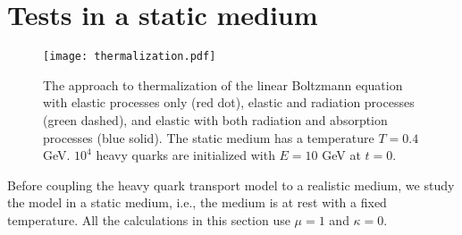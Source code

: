 \section{Tests in a static medium}\label{section:test}
\begin{figure}
\texttt{[image: thermalization.pdf]}
\caption{The approach to thermalization of the linear Boltzmann equation with elastic processes only (red dot), elastic and radiation processes (green dashed), and elastic with both radiation and absorption processes (blue solid). The static medium has a temperature $T = 0.4$ GeV. $10^4$ heavy quarks are initialized with $E = 10$ GeV at $t = 0$.}\label{plots:thermalization}
\end{figure}

Before coupling the heavy quark transport model to a realistic medium, we study the model in a static medium, i.e., the medium is at rest with a fixed temperature.
All the calculations in this section use $\mu =1$ and $\kappa = 0$.

